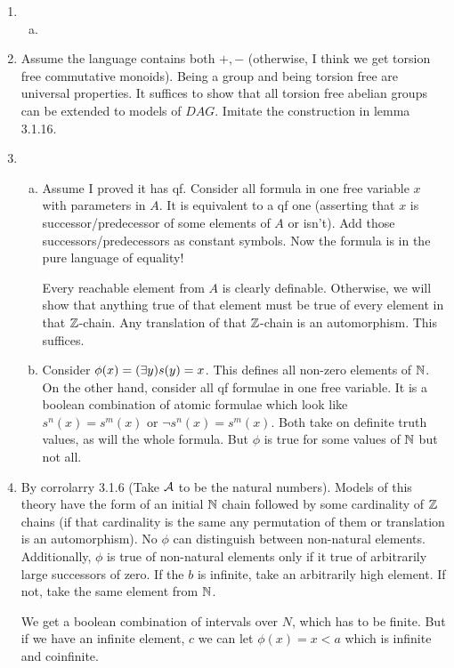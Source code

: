 
\begin{enumerate}[1.]
\item
 
  \begin{enumerate}[a)] 
  \item 
  \end{enumerate}

\item Assume the language contains both \(+, -\) (otherwise, I think we get torsion free commutative monoids). Being a group and being torsion free are universal properties. It suffices to show that all torsion free abelian groups can be extended to models of \(DAG\). Imitate the construction in lemma 3.1.16.  	

\item
 
  \begin{enumerate}[a)] 
  \item Assume I proved it has qf. Consider all formula in one free variable \(x\) with parameters in \(A\). It is equivalent to a qf one (asserting that \(x\) is successor/predecessor of some elements of \(A\) or isn't). Add those successors/predecessors as constant symbols. Now the formula is in the pure language of equality! 

Every reachable element from \(A\) is clearly definable. Otherwise, we will show that anything true of that element must be true of every element in that \(\mathbb{Z}\)-chain. Any translation of that \(\mathbb{Z}\)-chain is an automorphism. This suffices. 
 
  \item Consider \(\phi(x) = (\exists y) s(y) = x\). This defines all non-zero elements of \(\mathbb{N}\). On the other hand, consider all qf formulae in one free variable. It is a boolean combination of atomic formulae which look like \(s^n(x) = s^m(x)\) or \(\neg s^n(x) = s^m(x)\). Both take on definite truth values, as will the whole formula. But \(\phi\) is true for some values of \(\mathbb{N}\) but not all. 

  \end{enumerate}

\item By corrolarry 3.1.6 (Take \(\mathcal{A}\) to be the natural numbers). Models of this theory have the form of an initial \(\mathbb{N}\) chain followed by some cardinality of \(\mathbb{Z}\) chains (if that cardinality is the same any permutation of them or translation is an automorphism). No \(\phi\) can distinguish between non-natural elements. Additionally, \(\phi\) is true of non-natural elements only if it true of arbitrarily large successors of zero. If the \(b\) is infinite, take an arbitrarily high element. If not, take the same element from \(\mathbb{N}\). 

We get a boolean combination of intervals over \(N\), which has to be finite. But if we have an infinite element, \(c\) we can let \(\phi(x) = x < a\) which is infinite and coinfinite. 

\end{enumerate}
